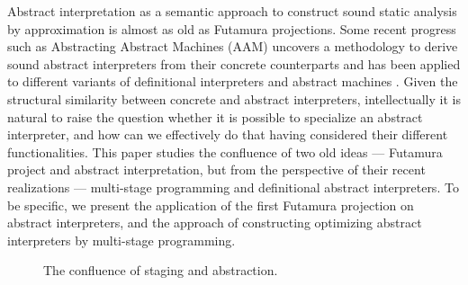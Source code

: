 Abstract interpretation \cite{DBLP:conf/popl/CousotC77} as a semantic approach to construct 
sound static analysis by approximation is almost as old as Futamura projections.
Some recent progress such as Abstracting Abstract Machines (AAM) uncovers a methodology to 
derive sound abstract interpreters from their concrete counterparts and has been applied to 
different variants of definitional interpreters and abstract machines
\cite{DBLP:journals/jfp/HornM12, DBLP:conf/icfp/HornM10, DBLP:journals/pacmpl/DaraisLNH17}.
Given the structural similarity between concrete and abstract interpreters, intellectually 
it is natural to raise the question whether it is possible to specialize an abstract interpreter, and how 
can we effectively do that having considered their different functionalities.
This paper studies the confluence of two old ideas --- Futamura project and abstract interpretation,
but from the perspective of their recent realizations --- multi-stage programming and definitional
abstract interpreters. To be specific, we present the application of the first Futamura projection
on abstract interpreters, and the approach of constructing optimizing abstract interpreters by 
multi-stage programming.

\begin{figure}[h]
  \caption{The confluence of staging and abstraction.}
  \label{confluence}
\end{figure}

